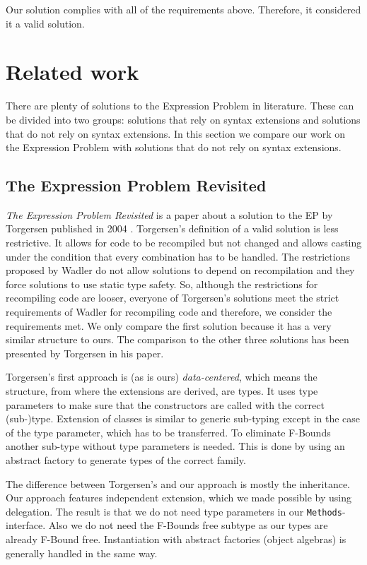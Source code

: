\documentclass{report}
\begin{document}
Our solution complies with all of the requirements above. Therefore, it considered it a valid solution.

\section{Related work}

There are plenty of solutions to the Expression Problem in literature. These can be divided into two groups: solutions that rely on syntax extensions and solutions that do not rely on syntax extensions. In this section we compare our work on the Expression Problem with solutions that do not rely on syntax extensions.

\subsection*{The Expression Problem Revisited}

\emph{The Expression Problem Revisited} is a paper about a solution to the EP by Torgersen published in 2004 \cite{Torgersen-Expression-2004}.
Torgersen's definition of a valid solution is less restrictive. It allows for code to be recompiled but not changed and allows casting under the condition that every combination has to be handled. The restrictions proposed by Wadler \cite{Wadler-Expression-1998} do not allow solutions to depend on recompilation and they force solutions to use static type safety. So, although the restrictions for recompiling code are looser, everyone of Torgersen's solutions meet the strict requirements of Wadler for recompiling code and therefore, we consider the requirements met. We only compare the first solution because it has a very similar structure to ours. The comparison to the other three solutions has been presented by Torgersen in his paper.

Torgersen's first approach is (as is ours) \emph{data-centered}, which means the structure, from where the extensions are derived, are types. It uses type parameters to make sure that the constructors are called with the correct (sub-)type. Extension of classes is similar to generic sub-typing except in the case of the type parameter, which has to be transferred. To eliminate F-Bounds another sub-type without type parameters is needed. This is done by using an abstract factory to generate types of the correct family.

The difference between Torgersen's and our approach is mostly the inheritance. Our approach features independent extension, which we made possible by using delegation. The result is that we do not need type parameters in our \lstinline{Methods}-interface. Also we do not need the F-Bounds free subtype as our types are already F-Bound free. Instantiation with abstract factories (object algebras) is generally handled in the same way.
\end{document}
